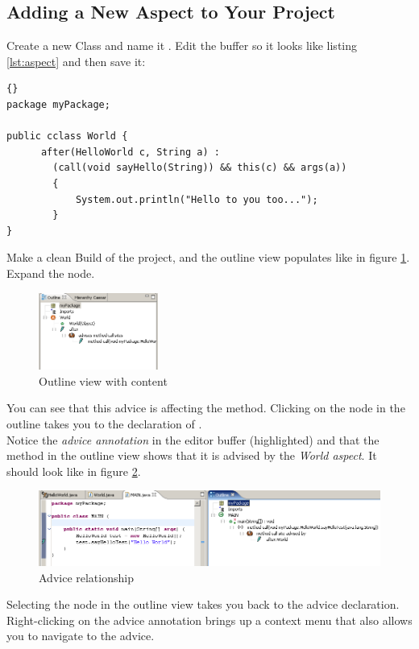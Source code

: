 \subsection{Adding a New Aspect to Your Project}
Create a new Class and name it . Edit the buffer so it looks like listing \ref{lst:aspect} and then save it:
\begin{lstlisting}[basicstyle=\small\it,caption=An \caesarj -cclass including an aspect,label=lst:aspect,name=listing:aspect,frame=none]{}
package myPackage;

public cclass World { 	
      after(HelloWorld c, String a) :
      	(call(void sayHello(String)) && this(c) && args(a))
		{
            System.out.println("Hello to you too...");
		}
}\end{lstlisting}

Make a clean Build of the project, and the outline view populates like in figure \ref{fig:aspect2}. Expand the  node.

\begin{figure}[htbp]
	\centering
		\includegraphics[width=0.35\textwidth]{images/aspect2.png}
	\caption{Outline view with content}
	\label{fig:aspect2}
\end{figure}

You can see that this advice is affecting the  method. Clicking on the  node in the outline takes you to the declaration of .\\
Notice the \textit{advice annotation} in the editor buffer (highlighted) and that the  method in the outline view shows that it is advised by the \textit{World aspect}. It should look like in figure \ref{fig:aspect3}.

\begin{figure}[htbp]
	\centering
		\includegraphics[width=1.0\textwidth]{images/aspect3.png}
	\caption{Advice relationship}
	\label{fig:aspect3}
\end{figure}

Selecting the  node in the outline view takes you back to the advice declaration. Right-clicking on the advice annotation brings up a context menu that also allows you to navigate to the advice.

